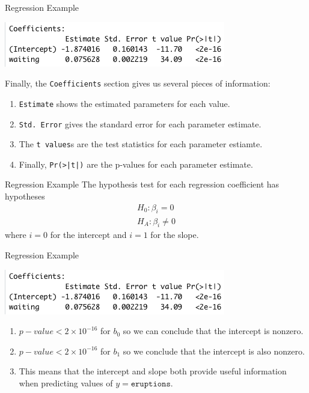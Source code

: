 \begin{frame}{Regression Example}
    \begin{center}
        \includegraphics[scale=0.6]{images/regcoef.png}
    \end{center}
    Finally, the \texttt{Coefficients} section gives us several pieces of information:
    \begin{enumerate}
        \item \texttt{Estimate} shows the estimated parameters for each value.
        \item \texttt{Std. Error} gives the standard error for each parameter estimate.
        \item The \texttt{t values}s are the test statistics for each parameter estiamte.
        \item Finally, \texttt{Pr(>|t|)} are the p-values for each parameter estimate.
    \end{enumerate}
\end{frame}

\begin{frame}{Regression Example}
    The hypothesis test for each regression coefficient has hypotheses
    \begin{align*}
        H_0: \beta_i = 0 \\
        H_A: \beta_i \ne 0
    \end{align*}
    where $i=0$ for the intercept and $i=1$ for the slope.
\end{frame}

\begin{frame}{Regression Example}
    \begin{center}
        \includegraphics[scale=0.6]{images/regcoef.png}
    \end{center}
    \begin{enumerate}
        \item $p-value < 2\times10^{-16}$ for $b_0$ so we can conclude that the intercept is nonzero.
        \item $p-value < 2\times10^{-16}$ for $b_1$ so we conclude that the intercept is also nonzero.
        \item This means that the intercept and slope both provide useful information when predicting values of $y=\texttt{eruptions}$.
    \end{enumerate} 
\end{frame}